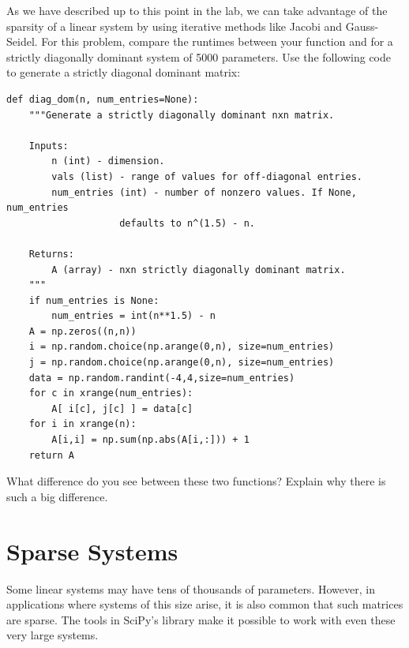 \begin{problem}
As we have described up to this point in the lab, we can take advantage of the
sparsity of a linear system by using iterative methods like Jacobi and Gauss-Seidel.
For this problem, compare the runtimes between your  function and
 for a strictly diagonally dominant system of 5000 parameters. Use the following
code to generate a strictly diagonal dominant matrix:
\begin{lstlisting}
def diag_dom(n, num_entries=None):
    """Generate a strictly diagonally dominant nxn matrix.

    Inputs:
        n (int) - dimension.
        vals (list) - range of values for off-diagonal entries.
        num_entries (int) - number of nonzero values. If None, num_entries
                    defaults to n^(1.5) - n.

    Returns:
        A (array) - nxn strictly diagonally dominant matrix.
    """
    if num_entries is None:
        num_entries = int(n**1.5) - n
    A = np.zeros((n,n))
    i = np.random.choice(np.arange(0,n), size=num_entries)
    j = np.random.choice(np.arange(0,n), size=num_entries)
    data = np.random.randint(-4,4,size=num_entries)
    for c in xrange(num_entries):
        A[ i[c], j[c] ] = data[c]
    for i in xrange(n):
        A[i,i] = np.sum(np.abs(A[i,:])) + 1
    return A
\end{lstlisting}
What difference do you see between these two functions? Explain why there is such a big difference.
\end{problem}

\section*{Sparse Systems} %

Some linear systems may have tens of thousands of parameters.
However, in applications where systems of this size arise, it is also common
that such matrices are sparse.
The tools in SciPy's  library make it possible to work with even these very large systems.

